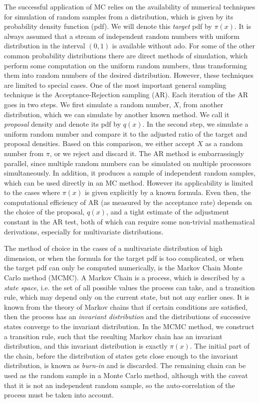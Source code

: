 \documentclass[11pt]{article}       %
\begin{document}
The successful application of MC relies on the availability of numerical
techniques for simulation of random samples from a distribution, which is given
by its probability density function (pdf).  We will denote this \emph{target}
pdf by $\pi(x)$.  It is always assumed that a stream of independent random
numbers with uniform distribution in the interval $(0,1)$ is available without
ado.  For some of the other common probability distributions there are direct
methods of simulation, which perform some computation on the uniform random
numbers, thus transforming them into random numbers of the desired
distribution.  However, these techniques are limited to special cases.  One of
the most important general sampling technique is the Acceptance-Rejection
sampling (AR).  Each iteration of the AR goes in two steps.  We first simulate
a random number, $X$, from another distribution, which we can simulate by
another known method.  We call it \emph{proposal} density and denote its pdf by
$q(x)$.  In the second step, we simulate a uniform random number and compare it
to the adjusted ratio of the target and proposal densities.  Based on this
comparison, we either accept $X$ as a random number from $\pi$, or we reject
and discard it.  The AR method is embarrassingly parallel, since multiple
random numbers can be simulated on multiple processors simultaneously.  In
addition, it produces a sample of independent random samples, which can be used
directly in an MC method.  However its applicability is limited to the cases
where $\pi(x)$ is given explicitly by a known formula.  Even then, the
computational efficiency of AR (as measured by the acceptance rate) depends on
the choice of the proposal, $q(x)$, and a tight estimate of the adjustment
constant in the AR test, both of which can require some non-trivial
mathematical derivations, especially for multivariate distributions.  

The method of choice in the cases of a multivariate distribution of high
dimension, or when the formula for the target pdf is too complicated, or when
the target pdf can only be computed numerically, is the Markov Chain Monte
Carlo method (MCMC).  A Markov Chain is a process, which is described by a
\emph{state space}, i.e. the set of all possible values the process can take,
and a transition rule, which may depend only on the current state, but not any
earlier ones. It is known from the theory of Markov chains that if certain
conditions are satisfied, then the process has an \emph{invariant distribution}
and the distributions of successive states converge to the invariant
distribution.  In the MCMC method, we construct a transition rule, such that
the resulting Markov chain has an invariant distribution, and this invariant
distribution is exactly $\pi(x)$.  The initial part of the chain, before the
distribution of states gets close enough to the invariant distribution, is
known as \emph{burn-in} and is discarded.  The remaining chain can be used as
the random sample in a Monte Carlo method, although with the caveat that it is
not an independent random sample, so the auto-correlation of the process must
be taken into account.  
\end{document}
